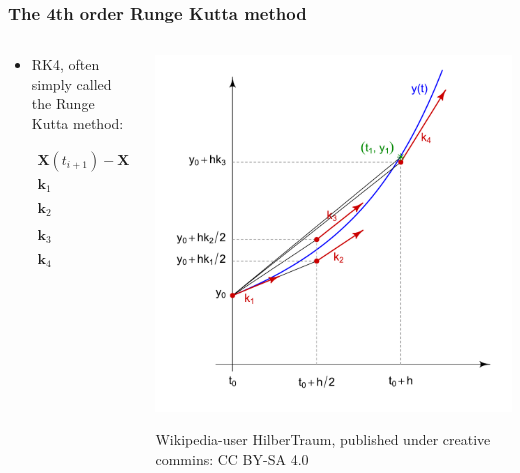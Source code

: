 \documentclass{beamer}
\begin{document}
\begin{frame}
\frametitle{The 4th order Runge Kutta method}
\begin{columns}
\begin{column}{0.5\linewidth}
\begin{itemize}

\item<1-> RK4, often simply called the Runge Kutta method:

\begin{align*}
\mathbf{X}(t_{i+1})-\mathbf{X}(t_{i}) &= \frac{h}{6}(\mathbf{k}_1+2\mathbf{k}_2+2\mathbf{k}_3+\mathbf{k}_4 )\\
\mathbf{k}_1 &= f_{ode}(\mathbf{X}(t_i),t_i)\\
\mathbf{k}_2 &= f_{ode}(\mathbf{X}(t_i)+\frac{h}{2}\mathbf{k}_1,t_i+\frac{h}{2})\\
\mathbf{k}_3 &= f_{ode}(\mathbf{X}(t_i)+\frac{h}{2}\mathbf{k}_2,t_i+\frac{h}{2})\\
\mathbf{k}_4 &= f_{ode}(\mathbf{X}(t_i)+h\mathbf{k}_3,t_i+h)\\
\end{align*}


\end{itemize}
\end{column}
\begin{column}{0.5\linewidth}
\includegraphics[width=\linewidth]{Runge-Kutta_slopes.pdf}

{\color{gray} Wikipedia-user HilberTraum, published under creative commins: CC BY-SA 4.0}
\end{column}
\end{columns}
\end{frame}
\end{document}
